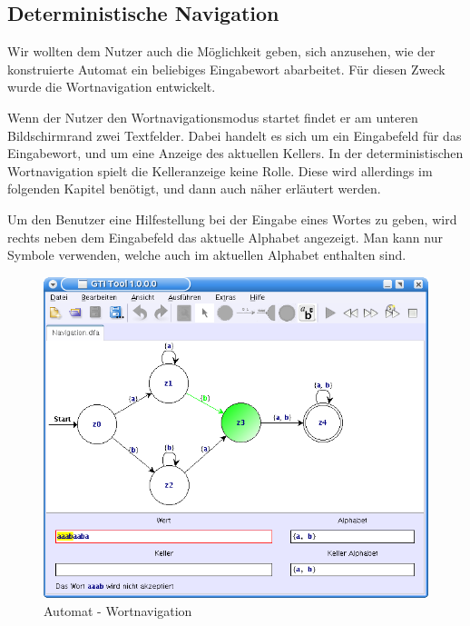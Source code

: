 \subsection{Deterministische Navigation}

Wir wollten dem Nutzer auch die Möglichkeit geben, sich anzusehen, wie der
konstruierte Automat ein beliebiges Eingabewort abarbeitet. Für diesen Zweck
wurde die Wortnavigation entwickelt.\vspace{10pt}

Wenn der Nutzer den Wortnavigationsmodus startet findet er am unteren
Bildschirmrand zwei Textfelder. Dabei handelt es sich um ein Eingabefeld für
das Eingabewort, und um eine Anzeige des aktuellen Kellers. In der
deterministischen Wortnavigation spielt die Kelleranzeige keine Rolle. Diese
wird allerdings im folgenden Kapitel benötigt, und dann auch näher erläutert
werden.\vspace{10pt}

Um den Benutzer eine Hilfestellung bei der Eingabe eines Wortes zu geben, wird
rechts neben dem Eingabefeld das aktuelle Alphabet angezeigt. Man kann nur
Symbole verwenden, welche auch im aktuellen Alphabet enthalten
sind.\vspace{10pt}

\begin{figure}[h]
\begin{center}
\includegraphics[width=12cm]{../images/dfa_navigation.png}
\caption{Automat - Wortnavigation}
\end{center}
\end{figure}
\vspace{10pt}

